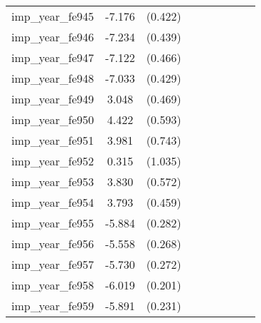 {\begin{tabular}{l*{4}{cc}}
imp\_year\_fe945&   -7.176\sym{***}&  (0.422)&                  &         &                  &         &                  &         \\
imp\_year\_fe946&   -7.234\sym{***}&  (0.439)&                  &         &                  &         &                  &         \\
imp\_year\_fe947&   -7.122\sym{***}&  (0.466)&                  &         &                  &         &                  &         \\
imp\_year\_fe948&   -7.033\sym{***}&  (0.429)&                  &         &                  &         &                  &         \\
imp\_year\_fe949&    3.048\sym{***}&  (0.469)&                  &         &                  &         &                  &         \\
imp\_year\_fe950&    4.422\sym{***}&  (0.593)&                  &         &                  &         &                  &         \\
imp\_year\_fe951&    3.981\sym{***}&  (0.743)&                  &         &                  &         &                  &         \\
imp\_year\_fe952&    0.315         &  (1.035)&                  &         &                  &         &                  &         \\
imp\_year\_fe953&    3.830\sym{***}&  (0.572)&                  &         &                  &         &                  &         \\
imp\_year\_fe954&    3.793\sym{***}&  (0.459)&                  &         &                  &         &                  &         \\
imp\_year\_fe955&   -5.884\sym{***}&  (0.282)&                  &         &                  &         &                  &         \\
imp\_year\_fe956&   -5.558\sym{***}&  (0.268)&                  &         &                  &         &                  &         \\
imp\_year\_fe957&   -5.730\sym{***}&  (0.272)&                  &         &                  &         &                  &         \\
imp\_year\_fe958&   -6.019\sym{***}&  (0.201)&                  &         &                  &         &                  &         \\
imp\_year\_fe959&   -5.891\sym{***}&  (0.231)&                  &         &                  &         &                  &         \\

\end{tabular}}
